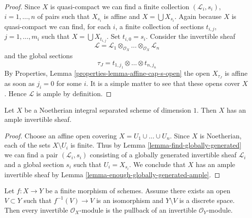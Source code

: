 \begin{proof}
Since $X$ is quasi-compact we can find a finite collection
$(\mathcal{L}_i, s_i)$, $i = 1, \ldots, n$
of pairs such that $X_{s_i}$ is affine and $X = \bigcup X_{s_i}$.
Again because $X$ is quasi-compact we can find, for each $i$, a finite
collection of sections $t_{i, j}$, $j = 1, \ldots, m_i$
such that $X = \bigcup X_{t_{i, j}}$. Set $t_{i, 0} = s_i$.
Consider the invertible sheaf
$$
\mathcal{L} = \mathcal{L}_1 
\otimes_{\mathcal{O}_X} \ldots
\otimes_{\mathcal{O}_X} \mathcal{L}_n
$$
and the global sections
$$
\tau_J = t_{1, j_1} \otimes \ldots \otimes t_{n, j_n}
$$
By Properties, Lemma \ref{properties-lemma-affine-cap-s-open}
the open $X_{\tau_J}$ is affine as soon as $j_i = 0$ for some $i$.
It is a simple matter to see that these opens cover $X$.
Hence $\mathcal{L}$ is ample by definition.
\end{proof}

\begin{lemma}
\label{lemma-dim-1-noetherian-integral-separated-has-ample}
Let $X$ be a Noetherian integral separated scheme of dimension $1$.
Then $X$ has an ample invertible sheaf.
\end{lemma}

\begin{proof}
Choose an affine open covering $X = U_1 \cup \ldots \cup U_n$.
Since $X$ is Noetherian, each of the sets $X \setminus U_i$ is finite.
Thus by Lemma \ref{lemma-find-globally-generated}
we can find a pair $(\mathcal{L}_i, s_i)$
consisting of a globally generated invertible sheaf $\mathcal{L}_i$
and a global section $s_i$ such that $U_i = X_{s_i}$.
We conclude that $X$ has an ample invertible sheaf by
Lemma \ref{lemma-enough-globally-generated-ample}.
\end{proof}

\begin{lemma}
\label{lemma-surjective-pic-birational-finite}
Let $f : X \to Y$ be a finite morphism of schemes. Assume there
exists an open $V \subset Y$ such that $f^{-1}(V) \to V$ is an
isomorphism and $Y \setminus V$ is a discrete space. Then every
invertible $\mathcal{O}_X$-module is the pullback of an invertible
$\mathcal{O}_Y$-module.
\end{lemma}

